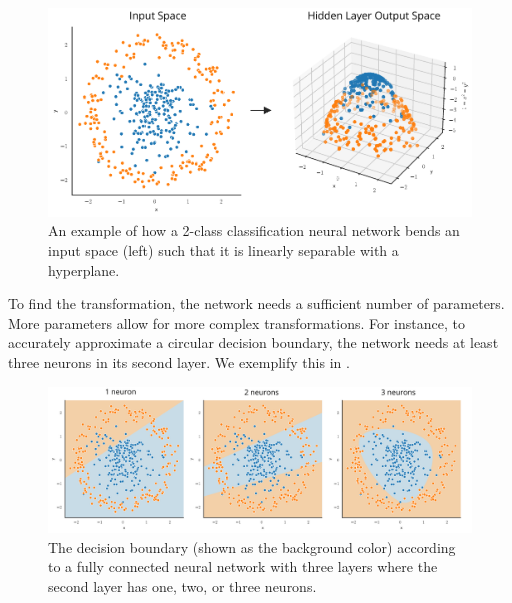 	\begin{figure}[t!]
		\centering
		\includegraphics[width=0.65\linewidth]{images/4/nn_trans_dataset}
		\caption{An example of how a 2-class classification neural network bends an input space (left) such that it is linearly separable with a hyperplane.}
		\label{fig:input-space-transform}
	\end{figure}

To find the transformation, the network needs a sufficient number of parameters. More parameters allow for more complex transformations. For instance, to accurately approximate a circular decision boundary, the network needs at least three neurons in its second layer. We exemplify this in .

	\begin{figure}[t!]
		\centering
		\includegraphics[width=\linewidth]{images/4/circular_dataset_neurons}
		\caption{The decision boundary (shown as the background color) according to a fully connected neural network with three layers where the second layer has one, two, or three neurons.}
		\label{fig:circ-datataset-neurons}
	\end{figure}


